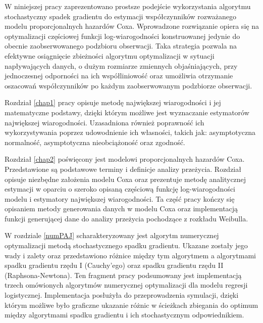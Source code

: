  W niniejszej pracy zaprezentowano prostsze podejście wykorzystania algorytmu stochastyczny spadek gradientu do estymacji współczynników rozważanego modelu proporcjonalnych hazardów Coxa. Wprowadzone rozwiązanie opiera się na optymalizacji częściowej funkcji log-wiarogodności konstruowanej jedynie do obecnie zaobserwowanego podzbioru obserwacji. Taka strategia pozwala na efektywne osiągnięcie zbieżności algorytmu optymalizacji w sytuacji napływających danych, o dużym rozmiarze zmiennych objaśniających, przy jednoczesnej odporności na ich współliniowość oraz umożliwia otrzymanie oszacowań współczynników po każdym zaobserwowanym podzbiorze obserwacji.

Rozdział \ref{chap1} pracy opisuje metodę największej wiarogodności i jej matematyczne podstawy, dzięki którym możliwe jest wyznaczanie estymatorów największej wiarogodności. Uzasadniona również poprawność ich wykorzystywania poprzez udowodnienie ich własności, takich jak: asymptotyczna normalność, asymptotyczna nieobciążoność oraz zgodność. 

Rozdział \ref{chap2} poświęcony jest modelowi proporcjonalnych hazardów Coxa. Przedstawione są podstawowe terminy i definicje analizy przeżycia. Rozdział opisuje niezbędne założenia modelu Coxa oraz prezentuje metodę analitycznej estymacji w oparciu o szeroko opisaną częściową funkcję log-wiarogodności modelu i estymatory największej wiarogodności. Ta część pracy kończy się opisaniem metody generowania danych w modelu Coxa oraz implementacją funkcji generującej dane do analizy przeżycia pochodzące z rozkładu Weibulla. 

W rozdziale \ref{numPAJ} scharakteryzowany jest algorytm numerycznej optymalizacji metodą stochastycznego spadku gradientu. Ukazane zostały jego wady i zalety oraz przedstawiono różnice między tym algorytmem a algorytmami spadku gradientu rzędu I (Cauchy'ego) oraz spadku gradientu rzędu II (Raphsona-Newtona). Ten fragment pracy podsumowany jest implementacją trzech omówionych algorytmów numerycznej optymalizacji dla modelu regresji logistycznej. Implementacja posłużyła do przeprowadzenia symulacji, dzięki którym możliwe było graficzne ukazanie różnic w ścieżkach zbiegania do optimum między algorytmami spadku gradientu i ich stochastycznym odpowiednikiem. 

